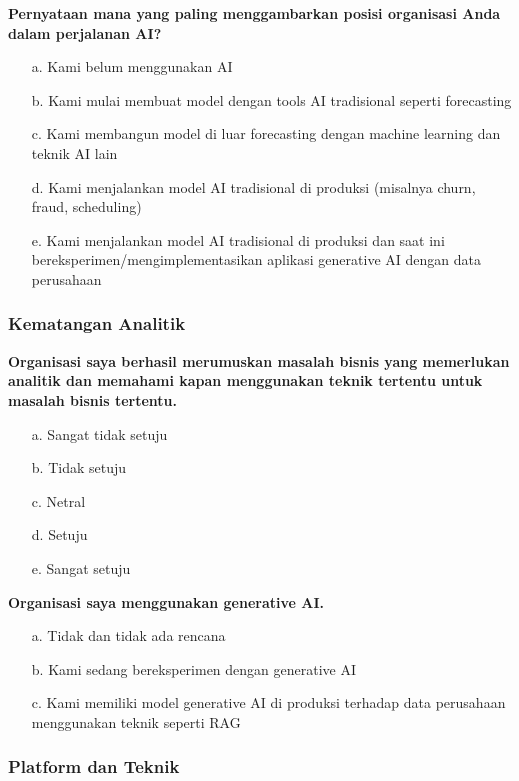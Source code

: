 \documentclass{article}
\begin{document}
\textbf{Pernyataan mana yang paling menggambarkan posisi organisasi Anda dalam perjalanan AI?}

\begin{enumerate}
	\item[a.] Kami belum menggunakan AI
	\item[b.] Kami mulai membuat model dengan tools AI tradisional seperti forecasting
	\item[c.] Kami membangun model di luar forecasting dengan machine learning dan teknik AI lain
	\item[d.] Kami menjalankan model AI tradisional di produksi (misalnya churn, fraud, scheduling)
	\item[e.] Kami menjalankan model AI tradisional di produksi dan saat ini bereksperimen/mengimplementasikan aplikasi generative AI dengan data perusahaan
\end{enumerate}

\subsubsection{Kematangan Analitik}

\textbf{Organisasi saya berhasil merumuskan masalah bisnis yang memerlukan analitik dan memahami kapan menggunakan teknik tertentu untuk masalah bisnis tertentu.}

\begin{enumerate}
	\item[a.] Sangat tidak setuju
	\item[b.] Tidak setuju
	\item[c.] Netral
	\item[d.] Setuju
	\item[e.] Sangat setuju
\end{enumerate}

\textbf{Organisasi saya menggunakan generative AI.}

\begin{enumerate}
	\item[a.] Tidak dan tidak ada rencana
	\item[b.] Kami sedang bereksperimen dengan generative AI
	\item[c.] Kami memiliki model generative AI di produksi terhadap data perusahaan menggunakan teknik seperti RAG
\end{enumerate}

\subsubsection{Platform dan Teknik}
\end{document}

